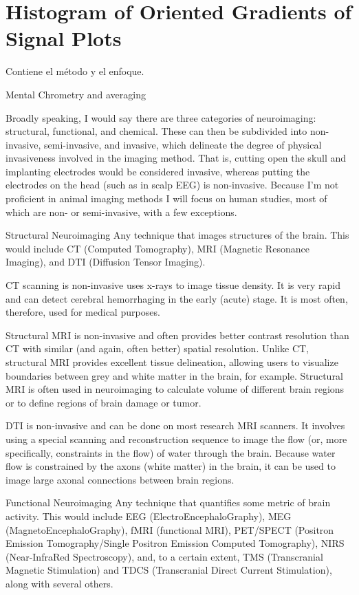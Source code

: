 \chapter{Histogram of Oriented Gradients of Signal Plots}

Contiene el método y el enfoque.

Mental Chrometry and averaging 



Broadly speaking, I would say there are three categories of neuroimaging: structural, functional, and chemical. These can then be subdivided into non-invasive, semi-invasive, and invasive, which delineate the degree of physical invasiveness involved in the imaging method. That is, cutting open the skull and implanting electrodes would be considered invasive, whereas putting the electrodes on the head (such as in scalp EEG) is non-invasive. Because I'm not proficient in animal imaging methods I will focus on human studies, most of which are non- or semi-invasive, with a few exceptions.

Structural Neuroimaging
Any technique that images structures of the brain. This would include CT (Computed Tomography), MRI (Magnetic Resonance Imaging), and DTI (Diffusion Tensor Imaging).

CT scanning is non-invasive uses x-rays to image tissue density. It is very rapid and can detect cerebral hemorrhaging in the early (acute) stage. It is most often, therefore, used for medical purposes.

Structural MRI is non-invasive and often provides better contrast resolution than CT with similar (and again, often better) spatial resolution. Unlike CT, structural MRI provides excellent tissue delineation, allowing users to visualize boundaries between grey and white matter in the brain, for example. Structural MRI is often used in neuroimaging to calculate volume of different brain regions or to define regions of brain damage or tumor.

DTI is non-invasive and can be done on most research MRI scanners. It involves using a special scanning and reconstruction sequence to image the flow (or, more specifically, constraints in the flow) of water through the brain. Because water flow is constrained by the axons (white matter) in the brain, it can be used to image large axonal connections between brain regions.


Functional Neuroimaging
Any technique that quantifies some metric of brain activity. This would include EEG (ElectroEncephaloGraphy), MEG (MagnetoEncephaloGraphy), fMRI (functional MRI), PET/SPECT (Positron Emission Tomography/Single Positron Emission Computed Tomography), NIRS (Near-InfraRed Spectroscopy), and, to a certain extent, TMS (Transcranial Magnetic Stimulation) and TDCS (Transcranial Direct Current Stimulation), along with several others.
